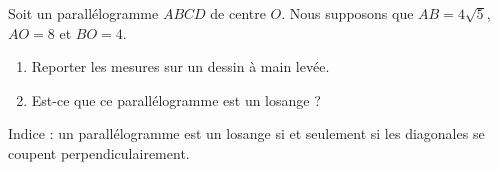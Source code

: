 
\begin{exercice}\label{exosmath-0124}

    Soit un parallélogramme \( ABCD\) de centre \( O\). Nous supposons que \( AB=4\sqrt{5}\), \( AO=8\) et \( BO=4\).
    \begin{enumerate}
        \item
            Reporter les mesures sur un dessin à main levée.
        \item
            Est-ce que ce parallélogramme est un losange ?
    \end{enumerate}
    Indice : un parallélogramme est un losange si et seulement si les diagonales se coupent perpendiculairement.

\end{exercice}
